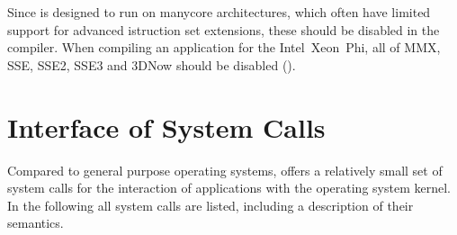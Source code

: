 Since \mythos is designed to run on manycore architectures, which often have limited support for advanced istruction set extensions, these should be disabled in the compiler. When compiling an application for the Intel\textcopyright~Xeon~Phi\superscript{\texttrademark}, all of MMX, SSE, SSE2, SSE3 and 3DNow should be disabled ().


\section{Interface of \mythos System Calls}
Compared to general purpose operating systems, \mythos offers a relatively
small set of system calls for the interaction of applications with the
operating system kernel. In the following all system calls are listed,
including a description of their semantics.

